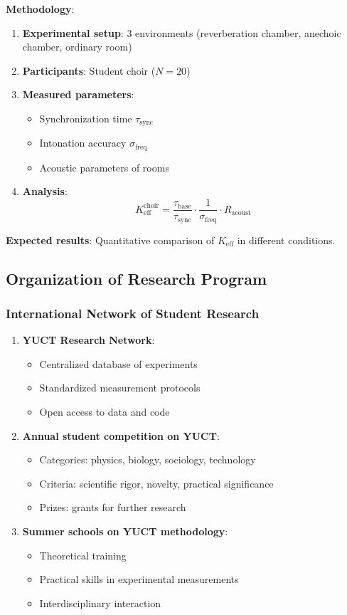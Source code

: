 \documentclass[12pt,a4paper]{article}
\begin{document}
	\textbf{Methodology}:
	\begin{enumerate}
		\item \textbf{Experimental setup}: 3 environments (reverberation chamber, anechoic chamber, ordinary room)
		\item \textbf{Participants}: Student choir ($N=20$)
		\item \textbf{Measured parameters}:
		\begin{itemize}
			\item Synchronization time $\tau_{\mathrm{sync}}$
			\item Intonation accuracy $\sigma_{\mathrm{freq}}$
			\item Acoustic parameters of rooms
		\end{itemize}
		\item \textbf{Analysis}:
		\[
		K_{\mathrm{eff}}^{\mathrm{choir}} = \frac{\tau_{\mathrm{base}}}{\tau_{\mathrm{sync}}} \cdot \frac{1}{\sigma_{\mathrm{freq}}} \cdot R_{\mathrm{acoust}}
		\]
	\end{enumerate}
	
	\textbf{Expected results}: Quantitative comparison of $K_{\mathrm{eff}}$ in different conditions.
	
	\subsection{Organization of Research Program}
	
	\subsubsection{International Network of Student Research}
	
	\begin{enumerate}
		\item \textbf{YUCT Research Network}:
		\begin{itemize}
			\item Centralized database of experiments
			\item Standardized measurement protocols
			\item Open access to data and code
		\end{itemize}
		
		\item \textbf{Annual student competition on YUCT}:
		\begin{itemize}
			\item Categories: physics, biology, sociology, technology
			\item Criteria: scientific rigor, novelty, practical significance
			\item Prizes: grants for further research
		\end{itemize}
		
		\item \textbf{Summer schools on YUCT methodology}:
		\begin{itemize}
			\item Theoretical training
			\item Practical skills in experimental measurements
			\item Interdisciplinary interaction
		\end{itemize}
	\end{enumerate}
	
\end{document}
